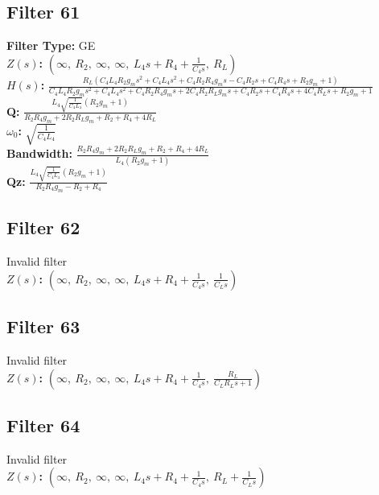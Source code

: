 \documentclass{article}
\begin{document}
\subsection*{Filter 61}
\textbf{Filter Type:} GE \\ 
\textbf{$Z(s)$:} $\left( \infty, \  R_{2}, \  \infty, \  \infty, \  L_{4} s + R_{4} + \frac{1}{C_{4} s}, \  R_{L}\right)$ \\ 
\textbf{$H(s)$:} $\frac{R_{L} \left(C_{4} L_{4} R_{2} g_{m} s^{2} + C_{4} L_{4} s^{2} + C_{4} R_{2} R_{4} g_{m} s - C_{4} R_{2} s + C_{4} R_{4} s + R_{2} g_{m} + 1\right)}{C_{4} L_{4} R_{2} g_{m} s^{2} + C_{4} L_{4} s^{2} + C_{4} R_{2} R_{4} g_{m} s + 2 C_{4} R_{2} R_{L} g_{m} s + C_{4} R_{2} s + C_{4} R_{4} s + 4 C_{4} R_{L} s + R_{2} g_{m} + 1}$ \\ 
\textbf{Q:} $\frac{L_{4} \sqrt{\frac{1}{C_{4} L_{4}}} \left(R_{2} g_{m} + 1\right)}{R_{2} R_{4} g_{m} + 2 R_{2} R_{L} g_{m} + R_{2} + R_{4} + 4 R_{L}}$ \\ 
\textbf{$\omega_0$:} $\sqrt{\frac{1}{C_{4} L_{4}}}$ \\ 
\textbf{Bandwidth:} $\frac{R_{2} R_{4} g_{m} + 2 R_{2} R_{L} g_{m} + R_{2} + R_{4} + 4 R_{L}}{L_{4} \left(R_{2} g_{m} + 1\right)}$ \\ 
\textbf{Qz:} $\frac{L_{4} \sqrt{\frac{1}{C_{4} L_{4}}} \left(R_{2} g_{m} + 1\right)}{R_{2} R_{4} g_{m} - R_{2} + R_{4}}$ \\ 
\subsection*{Filter 62}
Invalid filter \\ 
\textbf{$Z(s)$:} $\left( \infty, \  R_{2}, \  \infty, \  \infty, \  L_{4} s + R_{4} + \frac{1}{C_{4} s}, \  \frac{1}{C_{L} s}\right)$ \\ 
\subsection*{Filter 63}
Invalid filter \\ 
\textbf{$Z(s)$:} $\left( \infty, \  R_{2}, \  \infty, \  \infty, \  L_{4} s + R_{4} + \frac{1}{C_{4} s}, \  \frac{R_{L}}{C_{L} R_{L} s + 1}\right)$ \\ 
\subsection*{Filter 64}
Invalid filter \\ 
\textbf{$Z(s)$:} $\left( \infty, \  R_{2}, \  \infty, \  \infty, \  L_{4} s + R_{4} + \frac{1}{C_{4} s}, \  R_{L} + \frac{1}{C_{L} s}\right)$ \\ 
\end{document}
